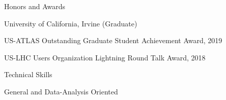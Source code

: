 \vspace{0.2in}
{\Large Honors and Awards}\\
\HRule

\hspace{0.25in}
\begin{minipage}{0.8\textwidth}

    \vspace{0.15in}
    University of California, Irvine (Graduate)
    
	\vspace{0.05in}
    \hspace{0.15in}
    \begin{minipage}{1.0\textwidth}
        \vspace{0.1in}
        US-ATLAS Outstanding Graduate Student Achievement Award, 2019

        \vspace{0.1in}
        US-LHC Users Organization Lightning Round Talk Award, 2018
    \end{minipage}
\end{minipage}


		




\vspace{0.35in}
{\Large Technical Skills} \\
\HRule
\vspace{0.15in}

\hspace{0.2in}
General and Data-Analysis Oriented
\vspace{0.1in}

